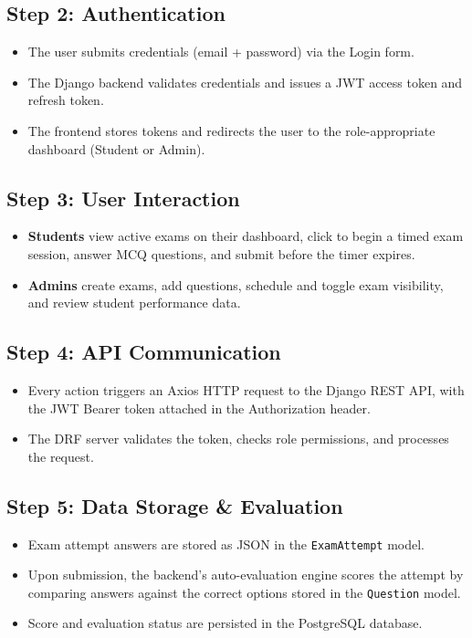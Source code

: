 \documentclass[12pt,a4paper]{article}
\begin{document}
\subsection*{Step 2: Authentication}
\begin{itemize}[leftmargin=1.5em]
  \item[(a)] The user submits credentials (email + password) via the Login form.
  \item[(b)] The Django backend validates credentials and issues a JWT access token and refresh token.
  \item[(c)] The frontend stores tokens and redirects the user to the role-appropriate dashboard (Student or Admin).
\end{itemize}

\subsection*{Step 3: User Interaction}
\begin{itemize}[leftmargin=1.5em]
  \item[(a)] \textbf{Students} view active exams on their dashboard, click to begin a timed exam session, answer MCQ questions, and submit before the timer expires.
  \item[(b)] \textbf{Admins} create exams, add questions, schedule and toggle exam visibility, and review student performance data.
\end{itemize}

\subsection*{Step 4: API Communication}
\begin{itemize}[leftmargin=1.5em]
  \item[(a)] Every action triggers an Axios HTTP request to the Django REST API, with the JWT Bearer token attached in the Authorization header.
  \item[(b)] The DRF server validates the token, checks role permissions, and processes the request.
\end{itemize}

\subsection*{Step 5: Data Storage \& Evaluation}
\begin{itemize}[leftmargin=1.5em]
  \item[(a)] Exam attempt answers are stored as JSON in the \texttt{ExamAttempt} model.
  \item[(b)] Upon submission, the backend's auto-evaluation engine scores the attempt by comparing answers against the correct options stored in the \texttt{Question} model.
  \item[(c)] Score and evaluation status are persisted in the PostgreSQL database.
\end{itemize}
\end{document}
